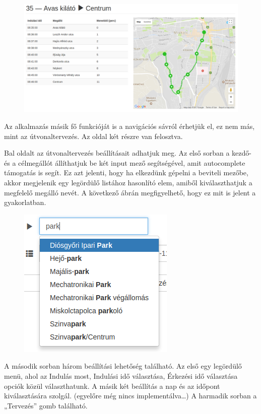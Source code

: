 \begin{figure}[htb]
\centering
\includegraphics[scale=0.35]{kepek/trip_tablazat_es_terkep.png}
\caption{}
\label{fig:trip_tablazat_es_terkep}
\end{figure}

Az alkalmazás másik fő funkcióját is a navigációs sávról érhetjük el, ez nem más, mint az útvonaltervezés. Az oldal két részre van felosztva.

Bal oldalt az útvonaltervezés beállításait adhatjuk meg. Az első sorban a kezdő- és a célmegállót állíthatjuk be két input mező segítségével, amit autocomplete támogatás is segít. Ez azt jelenti, hogy ha elkezdünk gépelni a beviteli mezőbe, akkor megjelenik egy legördülő listához hasonlító elem, amiből kiválaszthatjuk a megfelelő megálló nevét. A következő ábrán megfigyelhető, hogy ez mit is jelent a gyakorlatban.

\begin{figure}[htb]
\centering
\includegraphics[scale=0.6]{kepek/autocomplete.png}
\caption{}
\label{fig:autocomplete}
\end{figure}

A második sorban három beállítási lehetőség található. Az első egy legördülő menü, ahol az Indulás most, Indulási idő választása, Érkezési idő választása opciók közül választhatunk. A másik két beállítás a nap és az időpont kiválasztására szolgál. (egyelőre még nincs implementálva…) A harmadik sorban a „Tervezés” gomb található.

